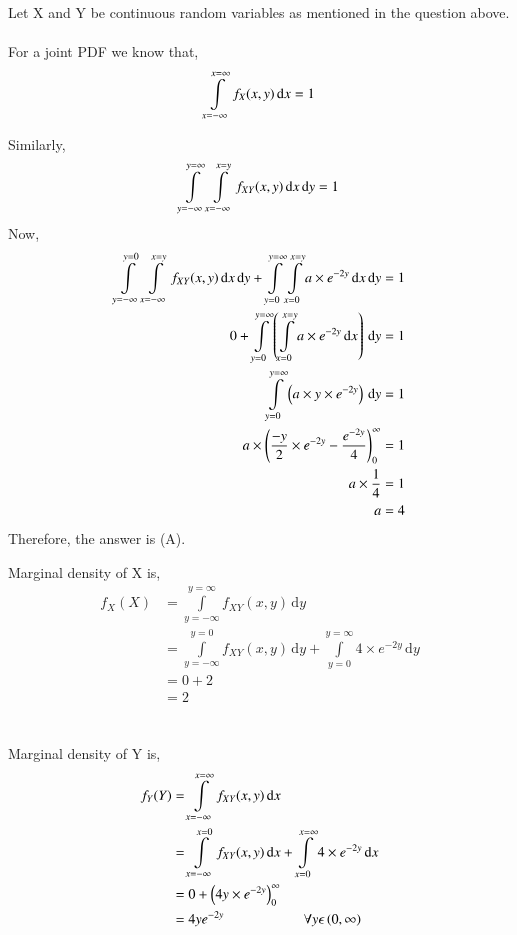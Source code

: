 Let X and Y be continuous random variables as mentioned in the question above.\\\\
For a joint PDF we know that,
$$\int \limits_{x=-\infty}^{x=\infty} f_X(x,y) \, \mathrm{d}x = 1\\\\$$

Similarly,
$$\int \limits_{y=-\infty}^{y=\infty} \int \limits_{x=-\infty}^{x=y}  f_{XY}(x,y) \, \mathrm{d}x \, \mathrm{d}y = 1 \\\\$$
Now,
\begin{align}
\int \limits_{y=-\infty}^{y=0} \int \limits_{x=-\infty}^{x=y}  f_{XY}(x,y) \, \mathrm{d}x \, \mathrm{d}y + \int \limits_{y=0}^{y=\infty} \int \limits_{x=0}^{x=y}  a \times {e}^{-2y} \, \mathrm{d}x \, \mathrm{d}y &= 1 \\
0 + \int \limits_{y=0}^{y=\infty} \left(\int \limits_{x=0}^{x=y}  a \times {e}^{-2y} \, \mathrm{d}x\right) \, \mathrm{d}y &= 1 \\
\int \limits_{y=0}^{y=\infty} \left(a \times y \times {e}^{-2y}\right) \, \mathrm{d}y &= 1 \\
a \times \left(\frac{-y}{2} \times {e}^{-2y} - \frac{{e}^{-2y}}{4}\right)_0^\infty &= 1 \\
a \times \frac{1}{4} &= 1\\
a &= 4 
\end{align}
 Therefore, the answer is (A). 

Marginal density of X is,
\begin{align}
f_X(X) &= \int \limits_{y=-\infty}^{y=\infty} f_{XY}(x,y) \, \mathrm{d}y \\
&= \int \limits_{y=-\infty}^{y=0} f_{XY}(x,y) \, \mathrm{d}y + \int \limits_{y=0}^{y=\infty} 4 \times {e}^{-2y} \, \mathrm{d}y \\
&= 0 + 2 \\
&= 2 
\end{align}
\\\\

Marginal density of Y is,
\begin{align}
f_Y(Y) &= \int \limits_{x=-\infty}^{x=\infty} f_{XY}(x,y) \, \mathrm{d}x \\
&= \int \limits_{x=-\infty}^{x=0} f_{XY}(x,y) \, \mathrm{d}x + \int \limits_{x=0}^{x=\infty} 4 \times {e}^{-2y} \, \mathrm{d}x \\
&= 0 + \left(4y \times {e}^{-2y}\right)_0^\infty \\
&= 4y{e}^{-2y} \hspace{2cm} \forall  y \epsilon \left(0,\infty\right)\\
\end{align}
